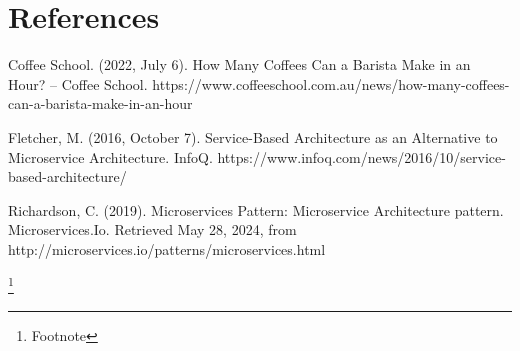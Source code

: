 \documentclass{article}
\begin{document}
\section{References}
\par \sloppy Coffee School. (2022, July 6). How Many Coffees Can a Barista Make in an Hour? – Coffee School. https://www.coffeeschool.com.au/news/how-many-coffees-can-a-barista-make-in-an-hour
\par Fletcher, M. (2016, October 7). Service-Based Architecture as an Alternative to Microservice Architecture. InfoQ. https://www.infoq.com/news/2016/10/service-based-architecture/
\par Richardson, C. (2019). Microservices Pattern: Microservice Architecture pattern. Microservices.Io. Retrieved May 28, 2024, from http://microservices.io/patterns/microservices.html

\footnote{Footnote}
\end{document}
